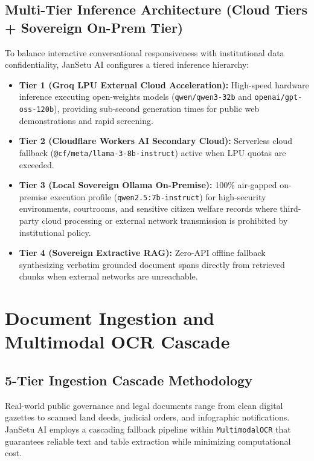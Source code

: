 \documentclass[12pt,a4paper,oneside]{report}
\begin{document}
\section{Multi-Tier Inference Architecture (Cloud Tiers + Sovereign On-Prem Tier)}
To balance interactive conversational responsiveness with institutional data confidentiality, JanSetu AI configures a tiered inference hierarchy:
\begin{itemize}[itemsep=2pt]
    \item \textbf{Tier 1 (Groq LPU External Cloud Acceleration):} High-speed hardware inference executing open-weights models (\texttt{qwen/qwen3-32b} and \texttt{openai/gpt-oss-120b}), providing sub-second generation times for public web demonstrations and rapid screening.
    \item \textbf{Tier 2 (Cloudflare Workers AI Secondary Cloud):} Serverless cloud fallback (\texttt{@cf/meta/llama-3-8b-instruct}) active when LPU quotas are exceeded.
    \item \textbf{Tier 3 (Local Sovereign Ollama On-Premise):} 100\% air-gapped on-premise execution profile (\texttt{qwen2.5:7b-instruct}) for high-security environments, courtrooms, and sensitive citizen welfare records where third-party cloud processing or external network transmission is prohibited by institutional policy.
    \item \textbf{Tier 4 (Sovereign Extractive RAG):} Zero-API offline fallback synthesizing verbatim grounded document spans directly from retrieved chunks when external networks are unreachable.
\end{itemize}

\newpage

\chapter{Document Ingestion and Multimodal OCR Cascade}

\section{5-Tier Ingestion Cascade Methodology}
Real-world public governance and legal documents range from clean digital gazettes to scanned land deeds, judicial orders, and infographic notifications. JanSetu AI employs a cascading fallback pipeline within \texttt{MultimodalOCR} that guarantees reliable text and table extraction while minimizing computational cost.
\end{document}
